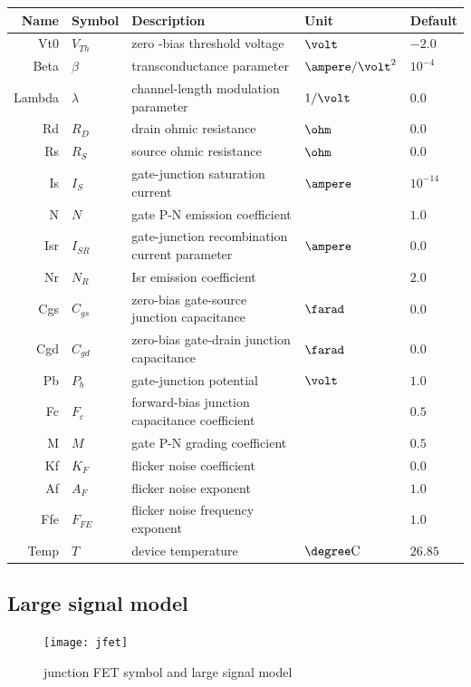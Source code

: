 \documentclass[10pt]{report}
\begin{document}
\begin{tabular}{rllll}
Name & Symbol & Description & Unit & Default\\
\hline
Vt0 & $V_{Th}$ & zero -bias threshold voltage & $\volt$ & $-2.0$\\
Beta & $\beta$ & transconductance parameter & $\ampere / \volt^{2}$ & $10^{-4}$\\
Lambda & $\lambda$ & channel-length modulation parameter & $1/\volt$ & $0.0$\\
Rd & $R_{D}$ & drain ohmic resistance & $\ohm$ & $0.0$\\
Rs & $R_{S}$ & source ohmic resistance & $\ohm$ & $0.0$\\
Is & $I_{S}$ & gate-junction saturation current & $\ampere$ & $10^{-14}$\\
N & $N$ & gate P-N emission coefficient & & $1.0$\\
Isr & $I_{SR}$ & gate-junction recombination current parameter & $\ampere$ & $0.0$\\
Nr & $N_{R}$ & Isr emission coefficient & & $2.0$\\
Cgs & $C_{gs}$ & zero-bias gate-source junction capacitance & $\farad$ & $0.0$\\
Cgd & $C_{gd}$ & zero-bias gate-drain junction capacitance & $\farad$ & $0.0$\\
Pb & $P_{b}$ & gate-junction potential & $\volt$ & $1.0$\\
Fc & $F_{c}$ & forward-bias junction capacitance coefficient & & $0.5$\\
M & $M$ & gate P-N grading coefficient & & $0.5$\\
Kf & $K_F$ & flicker noise coefficient & & $0.0$\\
Af & $A_F$ & flicker noise exponent & & $1.0$\\
Ffe & $F_{FE}$ & flicker noise frequency exponent & & $1.0$\\
Temp & $T$ & device temperature & $\degree \mathrm{C}$ & $26.85$
\end{tabular}

\addvspace{12pt}

\subsection{Large signal model}

\begin{figure}[ht]
\begin{center}
\texttt{[image: jfet]}
\end{center}
\caption{junction FET symbol and large signal model}
\label{fig:jfet}
\end{figure}
\FloatBarrier
\end{document}
